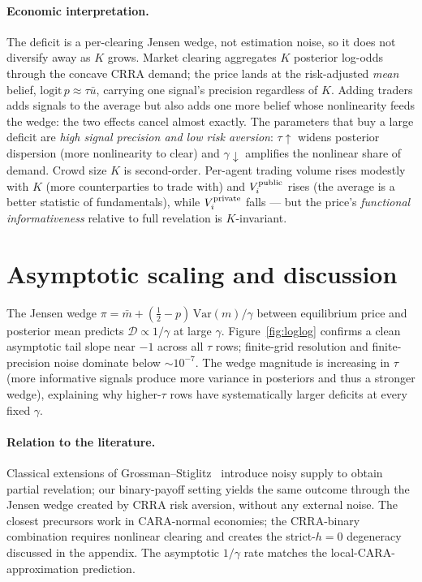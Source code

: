 \documentclass[11pt]{article}
\newcommand{\1}{\mathbf{1}}
\newcommand{\deficit}{\mathcal{D}}
\begin{document}
\paragraph{Economic interpretation.}
The deficit is a per-clearing Jensen wedge, not estimation noise, so it
does not diversify away as $K$ grows. Market clearing aggregates $K$
posterior log-odds through the concave CRRA demand; the price lands at
the risk-adjusted \emph{mean} belief, $\mathrm{logit}\,p\approx\tau\bar u$,
carrying one signal's precision regardless of $K$. Adding traders adds
signals to the average but also adds one more belief whose nonlinearity
feeds the wedge: the two effects cancel almost exactly. The
parameters that buy a large deficit are \emph{high signal precision and
low risk aversion}: $\tau\uparrow$ widens posterior dispersion (more
nonlinearity to clear) and $\gamma\downarrow$ amplifies the nonlinear
share of demand. Crowd size $K$ is second-order. Per-agent trading
volume rises modestly with $K$ (more counterparties to trade with) and
$V_i^{\rm public}$ rises (the average is a better statistic of fundamentals),
while $V_i^{\rm private}$ falls --- but the price's
\emph{functional informativeness} relative to full revelation is
$K$-invariant.

\section{Asymptotic scaling and discussion}

The Jensen wedge $\pi=\bar m+(\tfrac12-p)\,\mathrm{Var}(m)/\gamma$
between equilibrium price and posterior mean predicts
$\deficit\propto 1/\gamma$ at large $\gamma$. Figure~\ref{fig:loglog}
confirms a clean asymptotic tail slope near $-1$ across all $\tau$
rows; finite-grid resolution and finite-precision noise dominate below
$\sim 10^{-7}$. The wedge magnitude is increasing in $\tau$ (more
informative signals produce more variance in posteriors and thus a
stronger wedge), explaining why higher-$\tau$ rows have systematically
larger deficits at every fixed $\gamma$.

\paragraph{Relation to the literature.}
Classical extensions of Grossman--Stiglitz~\cite{GS1980,Vives2008}
introduce noisy supply to obtain partial revelation; our binary-payoff
setting yields the same outcome through the Jensen wedge created by
CRRA risk aversion, without any external noise. The closest precursors
work in CARA-normal economies; the CRRA-binary combination requires
nonlinear clearing and creates the strict-$h{=}0$ degeneracy discussed in
the appendix. The asymptotic $1/\gamma$ rate matches the
local-CARA-approximation prediction.
\end{document}
